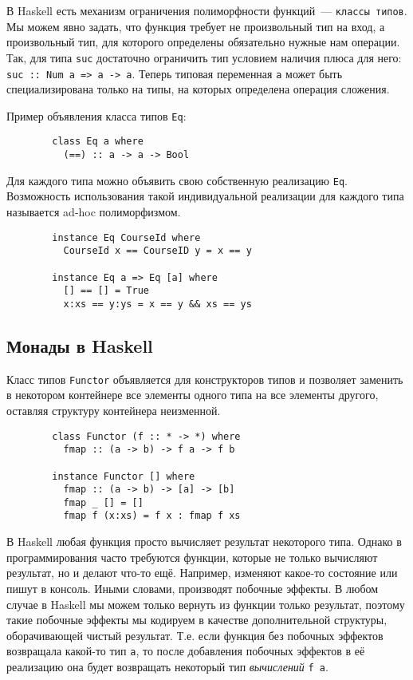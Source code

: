\documentclass[12pt]{article}
\newcommand{\point}[1]{{\color{blue}\textit{#1}}} %
\begin{document}
    В Haskell есть механизм ограничения полиморфности функций~--- \texttt{классы типов}.
    Мы можем явно задать, что функция требует не произвольный тип на вход, а произвольный тип, для которого определены обязательно нужные нам операции.
    Так, для типа \texttt{suc} достаточно ограничить тип условием наличия плюса для него: \texttt{suc :: Num a => a -> a}.
    Теперь типовая переменная \texttt{a} может быть специализирована только на типы, на которых определена операция сложения.

    Пример объявления класса типов \texttt{Eq}:
    \begin{verbatim}
        class Eq a where
          (==) :: a -> a -> Bool
    \end{verbatim}

    Для каждого типа можно объявить свою собственную реализацию \texttt{Eq}.
    Возможность использования такой индивидуальной реализации для каждого типа называется ad-hoc полиморфизмом.
    \begin{verbatim}
        instance Eq CourseId where
          CourseId x == CourseID y = x == y

        instance Eq a => Eq [a] where
          [] == [] = True
          x:xs == y:ys = x == y && xs == ys
    \end{verbatim}

    \subsection{Монады в Haskell}

    Класс типов \texttt{Functor} объявляется для конструкторов типов и позволяет заменить в некотором контейнере все элементы одного типа на все элементы другого, оставляя структуру контейнера неизменной.

    \begin{verbatim}
        class Functor (f :: * -> *) where
          fmap :: (a -> b) -> f a -> f b

        instance Functor [] where
          fmap :: (a -> b) -> [a] -> [b]
          fmap _ [] = []
          fmap f (x:xs) = f x : fmap f xs
    \end{verbatim}

    В Haskell любая функция просто вычисляет результат некоторого типа.
    Однако в программирования часто требуются функции, которые не только вычисляют результат, но и делают что-то ещё.
    Например, изменяют какое-то состояние или пишут в консоль.
    Иными словами, производят побочные эффекты.
    В любом случае в Haskell мы можем только вернуть из функции только результат, поэтому такие побочные эффекты мы кодируем в качестве дополнительной структуры, оборачивающей чистый результат.
    Т.е. если функция без побочных эффектов возвращала какой-то тип \texttt{a}, то после добавления побочных эффектов в её реализацию она будет возвращать некоторый тип \point{вычислений} \texttt{f a}.
\end{document}
